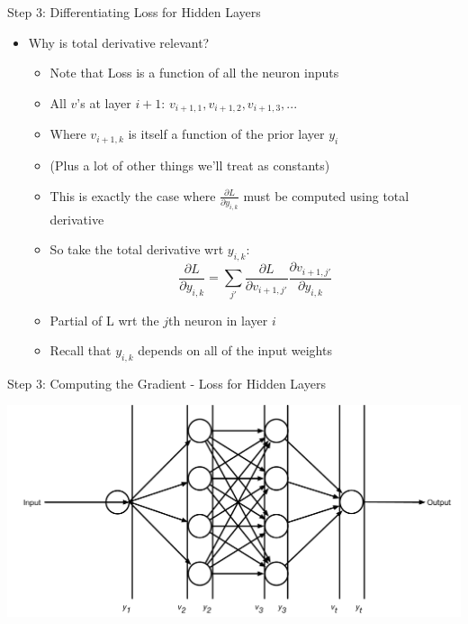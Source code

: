 \documentclass[aspectratio=169]{beamer}
\begin{document}
\begin{frame}{Step 3: Differentiating Loss for Hidden Layers}

\begin{itemize} 
	\item Why is total derivative relevant?
	\begin{itemize}
	\item Note that Loss is a function of all the neuron inputs
	\item All $v$'s at layer $i+1$: $v_{i+1,1}, v_{i+1,2}, v_{i+1,3}, ...$
	\item Where $v_{i+1,k}$ is itself a function of the prior layer $y_i$
	\item (Plus a lot of other things we'll treat as constants)
	\item This is exactly the case where $\frac{\partial L}{\partial y_{i,k}}$ must be computed using total
		derivative
	\item So take the total derivative wrt $y_{i,k}$:
		$$\frac{\partial L}{\partial y_{i,k}} = \sum_{j'} \frac{\partial L}{\partial v_{i+1,j'}}
			\frac{\partial  v_{i+1,j'}}{\partial y_{i,k}}$$
	\item Partial of L wrt the $j$th neuron in layer $i$
	\item Recall that $y_{i,k}$ depends on all of the input weights
	\end{itemize}
\end{itemize}
\end{frame}
\begin{frame}{Step 3: Computing the Gradient - Loss for Hidden Layers}

\includegraphics[width=1\textwidth]{lectBP/nnbpVs.pdf}
\end{frame}
\end{document}
